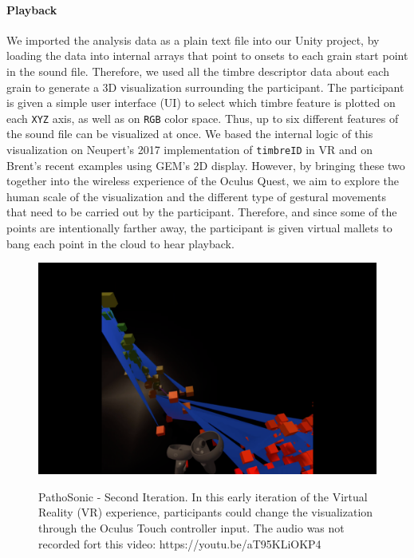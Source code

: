 \documentclass{nime-alternate}
\begin{document}
\paragraph{Playback}

We imported the analysis data as a plain text file into our Unity project, by loading the data into internal arrays that point to onsets to each grain start point in the sound file. Therefore, we used all the timbre descriptor data about each grain to generate a 3D visualization surrounding the participant. The participant is given a simple user interface (UI) to select which timbre feature is plotted on each \texttt{XYZ} axis, as well as on \texttt{RGB} color space. Thus, up to six different features of the sound file can be visualized at once. We based the internal logic of this visualization on Neupert's 2017 implementation of \texttt{timbreID} in VR and on Brent's recent examples using GEM's 2D display. However, by bringing these two together into the wireless experience of the Oculus Quest, we aim to explore the human scale of the visualization and the different type of gestural movements that need to be carried out by the participant. Therefore, and since some of the points are intentionally farther away, the participant is given virtual mallets to bang each point in the cloud to hear playback.

\begin{figure}[htbp]
       \centering
              \includegraphics[width=1\textwidth]{second_iteration.png}
       \label{PathoSonic - Second Iteration. In this early iteration of the Virtual Reality (VR) experience, participants could change the visualization through the Oculus Touch controller input. The audio was not recorded fort this video: https://youtu.be/aT95KLiOKP4}
       \caption{PathoSonic - Second Iteration. In this early iteration of the Virtual Reality (VR) experience, participants could change the visualization through the Oculus Touch controller input. The audio was not recorded fort this video: https://youtu.be/aT95KLiOKP4}
\end{figure}
\end{document}
